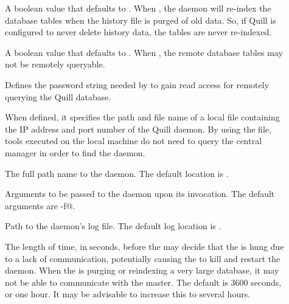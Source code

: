 \begin{description}
\item[]
  \label{param:QuillShouldReindex}
  A boolean value that defaults to .
  When , the  daemon will re-index the database
  tables when the history file is purged of old data. So, if Quill is
  configured to never delete history data, the tables are never re-indexed.

\item[]
  \label{param:QuillIsRemotelyQueryable}
  A boolean value that defaults to .
  When , the remote database tables may not be remotely
  queryable.

\item[] \label{param:QuillDBQueryPassword}
  Defines the password string needed by  to gain read
  access for remotely querying the Quill database.

\item[] \label{param:QuillAddressFile}
  When defined, it specifies the path and file name of a local file
  containing the IP address and port number of the Quill daemon.
  By using the file, tools executed on the local machine do not need
  to query the central manager in order to find the  daemon.

\item[] \label{param:DBMSD} 
  The full path name to the  daemon.
  The default location is .

\item[] \label{param:DBMSDArgs} Arguments
  to be passed to the  daemon upon its invocation.
  The default arguments are \verb@-f@.

\item[] \label{param:DBMSDLog}
  Path to the  daemon's log file.
  The default log location is .

\item[]
  The length of time, in seconds, before the 
  may decide that the  is hung due to a lack of communication,
  potentially causing  the  to kill and
  restart the  daemon.
  When the  is purging or reindexing a very large database, it 
  may not be able to communicate with the master. 
  The default is 3600 seconds, or one hour. It may be
  advisable to increase this to several hours. 

\end{description}



